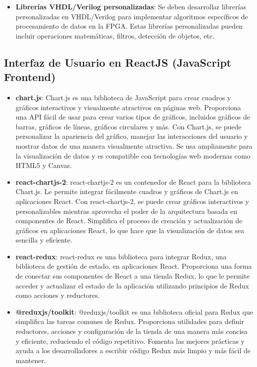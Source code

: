 \documentclass[osajnl,twocolumn,showpacs,superscriptaddress,10pt]{revtex4-1}
\begin{document}
\begin{itemize}
  \item \textbf{Librerías VHDL/Verilog personalizadas}: Se deben desarrollar librerías personalizadas en VHDL/Verilog para implementar algoritmos específicos de procesamiento de datos en la FPGA. Estas librerías personalizadas pueden incluir operaciones matemáticas, filtros, detección de objetos, etc.
\end{itemize}

\subsection*{Interfaz de Usuario en ReactJS (JavaScript Frontend)}

\begin{itemize}
  \item \textbf{chart.js}: 
  Chart.js es una biblioteca de JavaScript para crear cuadros y gráficos interactivos y visualmente atractivos en páginas web. Proporciona una API fácil de usar para crear varios tipos de gráficos, incluidos gráficos de barras, gráficos de líneas, gráficos circulares y más. Con Chart.js, se puede personalizar la apariencia del gráfico, manejar las interacciones del usuario y mostrar datos de una manera visualmente atractiva. Se usa ampliamente para la visualización de datos y es compatible con tecnologías web modernas como HTML5 y Canvas.
  \item \textbf{react-chartjs-2}:
  react-chartjs-2 es un contenedor de React para la biblioteca Chart.js. Le permite integrar fácilmente cuadros y gráficos de Chart.js en aplicaciones React. Con react-chartjs-2, se puede crear gráficos interactivos y personalizables mientras aprovecha el poder de la arquitectura basada en componentes de React. Simplifica el proceso de creación y actualización de gráficos en aplicaciones React, lo que hace que la visualización de datos sea sencilla y eficiente.
  \item \textbf{react-redux}:
  react-redux es una biblioteca para integrar Redux, una biblioteca de gestión de estado, en aplicaciones React. Proporciona una forma de conectar sus componentes de React a una tienda Redux, lo que le permite acceder y actualizar el estado de la aplicación utilizando principios de Redux como acciones y reductores.

  \item \textbf{@reduxjs/toolkit}:
  @reduxjs/toolkit es una biblioteca oficial para Redux que simplifica las tareas comunes de Redux. Proporciona utilidades para definir reductores, acciones y configuración de la tienda de una manera más concisa y eficiente, reduciendo el código repetitivo. Fomenta las mejores prácticas y ayuda a los desarrolladores a escribir código Redux más limpio y más fácil de mantener.
  

\end{itemize}
\end{document}
